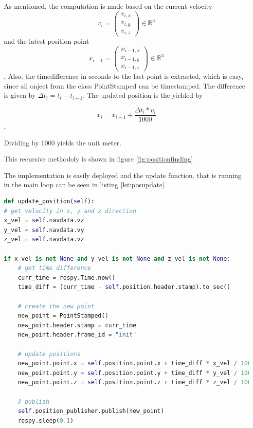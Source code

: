 	As mentioned, the computation is made based on the current velocity $$v_i = \begin{pmatrix} v_{i,x} \\ v_{i,y} \\ v_{i,z} \end{pmatrix} \in \mathbb{R}^3$$ and the 
	latest position point $$x_{i-1} = \begin{pmatrix} x_{i-1,x} \\ x_{i-1,y} \\ x_{i-1, z} \end{pmatrix} \in \mathbb{R}^3$$. Also, the timedifference 
	in seconds to the last point is extracted, which is easy, since all onject from the class PointStamped can be timestamped. The difference is given by 
	$\Delta t_i =  t_i - t_{i-1}$. The updated position is the yielded by
	
	$$x_{i} = x_{i-1} + \frac{\Delta t_i * v_i}{1000} $$. 
	
	Dividing by 1000 yields the unit meter. 
	
	This recursive methodoly is shown in figure \ref{fig:positionfinding}
	
	
	The implementation is easily deployed and the update function, that is running in the main loop can be seen in listing \ref{lst:posupdate}. 
	
	\begin{lstlisting}[language=python, caption=Main part of the position estimation node, label=lst:posupdate]
	def update_position(self):
# get velocity in x, y and z direction
x_vel = self.navdata.vz
y_vel = self.navdata.vy
z_vel = self.navdata.vz

if x_vel is not None and y_vel is not None and z_vel is not None:
	# get time difference
	curr_time = rospy.Time.now()
	time_diff = (curr_time - self.position.header.stamp).to_sec()
	
	# create the new point
	new_point = PointStamped()
	new_point.header.stamp = curr_time
	new_point.header.frame_id = "init"
	
	# update positions
	new_point.point.x = self.position.point.x + time_diff * x_vel / 1000
	new_point.point.y = self.position.point.y + time_diff * y_vel / 1000
	new_point.point.z = self.position.point.z + time_diff * z_vel / 1000
	
	# publish
	self.position_publisher.publish(new_point)
	rospy.sleep(0.1)
	\end{lstlisting}
	
